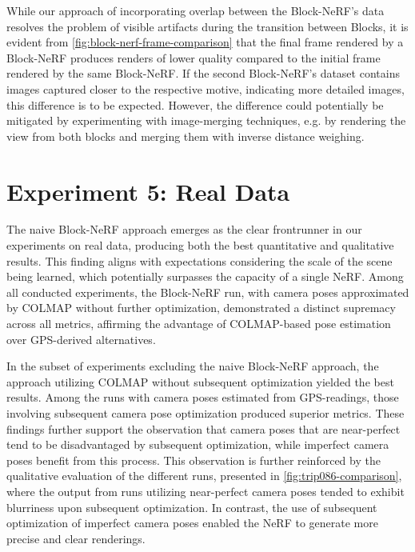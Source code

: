 While our approach of incorporating overlap between the Block-NeRF's data resolves the problem of visible artifacts during the transition between Blocks, it is evident from \autoref{fig:block-nerf-frame-comparison} that the final frame rendered by a Block-NeRF produces renders of lower quality compared to the initial frame rendered by the same Block-NeRF. If the second Block-NeRF's dataset contains images captured closer to the respective motive, indicating more detailed images, this difference is to be expected. However, the difference could potentially be mitigated by experimenting with image-merging techniques, e.g. by rendering the view from both blocks and merging them with inverse distance weighing.




\section{Experiment 5: Real Data}
The naive Block-NeRF approach emerges as the clear frontrunner in our experiments on real data, producing both the best quantitative and qualitative results. This finding aligns with expectations considering the scale of the scene being learned, which potentially surpasses the capacity of a single NeRF. Among all conducted experiments, the Block-NeRF run, with camera poses approximated by COLMAP without further optimization, demonstrated a distinct supremacy across all metrics, affirming the advantage of COLMAP-based pose estimation over GPS-derived alternatives.

In the subset of experiments excluding the naive Block-NeRF approach, the approach utilizing COLMAP without subsequent optimization yielded the best results. Among the runs with camera poses estimated from GPS-readings, those involving subsequent camera pose optimization produced superior metrics. These findings further support the observation that camera poses that are near-perfect tend to be disadvantaged by subsequent optimization, while imperfect camera poses benefit from this process. This observation is further reinforced by the qualitative evaluation of the different runs, presented in \autoref{fig:trip086-comparison}, where the output from runs utilizing near-perfect camera poses tended to exhibit blurriness upon subsequent optimization. In contrast, the use of subsequent optimization of imperfect camera poses enabled the NeRF to generate more precise and clear renderings.



